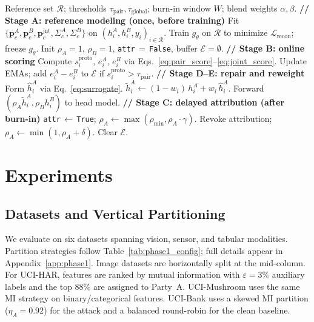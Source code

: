 \documentclass{article}
\begin{document}
\begin{algorithm}[t]
\caption{RGAR: Reference-Guided Attribution and Reconstruction}
\label{alg:rgar}
\begin{algorithmic}[1]
\REQUIRE Reference set $\mathcal{R}$; thresholds $\tau_{\mathrm{pair}},
  \tau_{\mathrm{global}}$; burn-in window $W$; blend weights $\alpha,\beta$.
\STATE \textbf{// Stage A: reference modeling (once, before training)}
\STATE Fit $\{\mathbf{p}^A_c,\mathbf{p}^B_c,\mathbf{p}^{\mathrm{jnt}}_c,\Sigma^A_c,\Sigma^B_c\}$
  on $(h^A_i,h^B_i,y_i)_{i\in\mathcal{R}}$.
\STATE Train $g_\theta$ on $\mathcal{R}$ to minimize $\mathcal{L}_{\mathrm{recon}}$;
  freeze $g_\theta$.
\STATE Init $\rho_A\!=\!1$, $\rho_B\!=\!1$,
  \texttt{attr}$\,=\,$\texttt{False}, buffer $\mathcal{E}\!=\!\emptyset$.
    \STATE \textbf{// Stage B: online scoring}
    \STATE Compute $s^{\mathrm{proto}}_i$, $e^A_i$, $e^B_i$ via
      Eqs.~\eqref{eq:pair_score}--\eqref{eq:joint_score}.
    \STATE Update EMAs; add $e^A_i\!-\!e^B_i$ to $\mathcal{E}$ if
      $s^{\mathrm{proto}}_i\!>\!\tau_{\mathrm{pair}}$.
    \STATE \textbf{// Stage D--E: repair and reweight}
      \STATE Form $\hat{h}^A_i$ via Eq.~\eqref{eq:surrogate}.
      \STATE $\tilde{h}^A_i \leftarrow (1-w_i)\,h^A_i + w_i\,\hat{h}^A_i$.
    \ENDFOR
    \STATE Forward $(\rho_A\tilde{h}^A_i, \rho_B h^B_i)$ to head model.
  \ENDFOR
  \STATE \textbf{// Stage C: delayed attribution (after burn-in)}
    \STATE \texttt{attr}$\,\leftarrow\,$\texttt{True};
      $\rho_A\leftarrow\max(\rho_{\min}, \rho_A\!\cdot\!\gamma)$.
    \STATE Revoke attribution; $\rho_A\leftarrow\min(1,\rho_A\!+\!\delta)$.
  \ENDIF
  \STATE Clear $\mathcal{E}$.
\ENDFOR
\end{algorithmic}
\end{algorithm}

\section{Experiments}
\label{sec:experiments}

\subsection{Datasets and Vertical Partitioning}
We evaluate on six datasets spanning vision, sensor, and tabular modalities.
Partition strategies follow Table~\ref{tab:phase1_config}; full details
appear in Appendix~\ref{app:phase1}.
Image datasets are horizontally split at the mid-column.
For UCI-HAR, features are ranked by mutual information with
$\varepsilon\!=\!3\%$ auxiliary labels and the top 88\% are assigned to
Party~A.
UCI-Mushroom uses the same MI strategy on binary/categorical features.
UCI-Bank uses a skewed MI partition ($\eta_A\!=\!0.92$) for the attack and
a balanced round-robin for the clean baseline.
\end{document}
